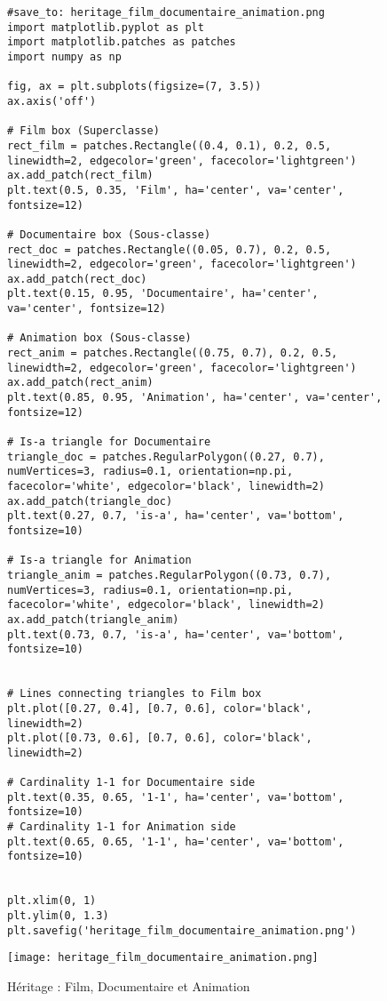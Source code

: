 \documentclass{article}
\begin{document}
\begin{figure}[H]
    \centering
    \begin{verbatim}
#save_to: heritage_film_documentaire_animation.png
import matplotlib.pyplot as plt
import matplotlib.patches as patches
import numpy as np

fig, ax = plt.subplots(figsize=(7, 3.5))
ax.axis('off')

# Film box (Superclasse)
rect_film = patches.Rectangle((0.4, 0.1), 0.2, 0.5, linewidth=2, edgecolor='green', facecolor='lightgreen')
ax.add_patch(rect_film)
plt.text(0.5, 0.35, 'Film', ha='center', va='center', fontsize=12)

# Documentaire box (Sous-classe)
rect_doc = patches.Rectangle((0.05, 0.7), 0.2, 0.5, linewidth=2, edgecolor='green', facecolor='lightgreen')
ax.add_patch(rect_doc)
plt.text(0.15, 0.95, 'Documentaire', ha='center', va='center', fontsize=12)

# Animation box (Sous-classe)
rect_anim = patches.Rectangle((0.75, 0.7), 0.2, 0.5, linewidth=2, edgecolor='green', facecolor='lightgreen')
ax.add_patch(rect_anim)
plt.text(0.85, 0.95, 'Animation', ha='center', va='center', fontsize=12)

# Is-a triangle for Documentaire
triangle_doc = patches.RegularPolygon((0.27, 0.7), numVertices=3, radius=0.1, orientation=np.pi, facecolor='white', edgecolor='black', linewidth=2)
ax.add_patch(triangle_doc)
plt.text(0.27, 0.7, 'is-a', ha='center', va='bottom', fontsize=10)

# Is-a triangle for Animation
triangle_anim = patches.RegularPolygon((0.73, 0.7), numVertices=3, radius=0.1, orientation=np.pi, facecolor='white', edgecolor='black', linewidth=2)
ax.add_patch(triangle_anim)
plt.text(0.73, 0.7, 'is-a', ha='center', va='bottom', fontsize=10)


# Lines connecting triangles to Film box
plt.plot([0.27, 0.4], [0.7, 0.6], color='black', linewidth=2)
plt.plot([0.73, 0.6], [0.7, 0.6], color='black', linewidth=2)

# Cardinality 1-1 for Documentaire side
plt.text(0.35, 0.65, '1-1', ha='center', va='bottom', fontsize=10)
# Cardinality 1-1 for Animation side
plt.text(0.65, 0.65, '1-1', ha='center', va='bottom', fontsize=10)


plt.xlim(0, 1)
plt.ylim(0, 1.3)
plt.savefig('heritage_film_documentaire_animation.png')

        \end{verbatim}
        \texttt{[image: heritage\_film\_documentaire\_animation.png]}
        \caption{Héritage : Film, Documentaire et Animation}
        \label{fig:heritage_film_documentaire_animation}
    \end{figure}
\end{document}
